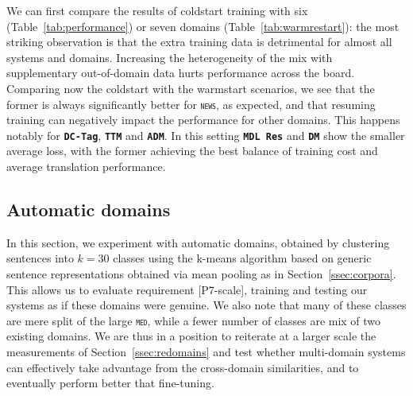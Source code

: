 \documentclass[11pt,a4paper]{article}
\newcommand{\fyTodo}[1]{\Todo[FY:]{\textcolor{orange}{#1}}}
\newcommand{\fyDone}[1]{\done[FY]\Todo[FY:]{\textcolor{orange}{#1}}}
\newcommand{\domain}[1]{\texttt{\textsc{#1}}}
\newcommand{\system}[1]{\texttt{\textbf{#1}}}
\begin{document}
We can first compare the results of coldstart training with six (Table~\ref{tab:performance}) or seven domains (Table~\ref{tab:warmrestart}): the most striking observation is that the extra training data is detrimental for almost all systems and domains\fyDone{is this significant ?}. Increasing the heterogeneity of the mix with supplementary out-of-domain data hurts performance across the board.
Comparing now the coldstart with the warmstart scenarios, we see that the former is always significantly better for \domain{news}, as expected, and that resuming training can negatively impact the performance for other domains. This happens notably for \system{DC-Tag}, \system{TTM} and \system{ADM}. In this setting \system{MDL Res} and \system{DM} show the smaller average loss, with the former achieving the best balance of training cost and average translation performance.%


\subsection{Automatic domains \label{ssec:autodomains}}
In this section, we experiment with automatic domains, obtained by clustering sentences into $k=30$ classes using the k-means algorithm based on generic sentence representations obtained via mean pooling as in Section~\ref{ssec:corpora}. This allows us to evaluate requirement [P7-scale], training and testing our systems as if these domains were genuine. We also note that many of these classes are mere split of the large \domain{med}, while a fewer number of classes are mix of two existing domains. We are thus in a position to reiterate at a larger scale the measurements of Section~\ref{ssec:redomains} and test whether multi-domain systems can effectively take advantage from the cross-domain similarities, and to eventually perform better that fine-tuning.
\end{document}
